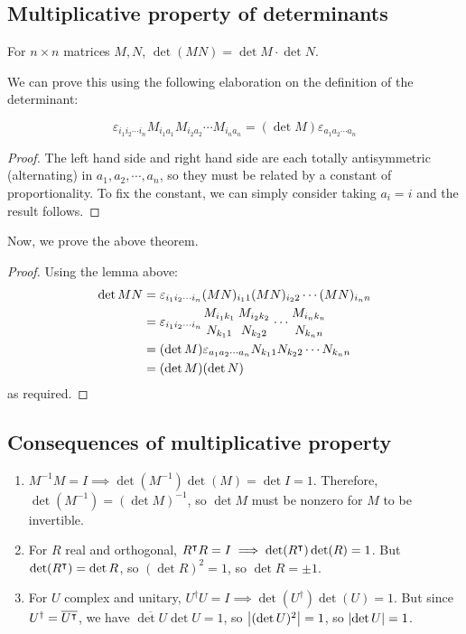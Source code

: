 \subsection{Multiplicative property of determinants}
\begin{theorem}
	For \(n\times n\) matrices \(M, N\), \(\det (MN) = \det M \cdot \det N\).
\end{theorem}
\noindent We can prove this using the following elaboration on the definition of the determinant:
\begin{lemma}
	\[
		\varepsilon_{i_1 i_2 \cdots i_n} M_{i_1 a_1} M_{i_2 a_2} \cdots M_{i_n a_n} = (\det M) \varepsilon_{a_1 a_2 \cdots a_n}
	\]
\end{lemma}
\begin{proof}
	The left hand side and right hand side are each totally antisymmetric (alternating) in \(a_1, a_2, \cdots, a_n\), so they must be related by a constant of proportionality.
	To fix the constant, we can simply consider taking \(a_i = i\) and the result follows.
\end{proof}
\noindent Now, we prove the above theorem.
\begin{proof}
	Using the lemma above:
	\begin{align*}
		\det MN & = \varepsilon_{i_1 i_2 \cdots i_n} (MN)_{i_1 1} (MN)_{i_2 2} \cdots (MN)_{i_n n}                                                    \\
		        & = \varepsilon_{i_1 i_2 \cdots i_n} {M_{i_1 k_1} \atop N_{k_1 1}} {M_{i_2 k_2} \atop N_{k_2 2}} \cdots {M_{i_n k_n} \atop N_{k_n n}} \\
		        & = (\det M) \varepsilon_{a_1 a_2 \cdots a_n} N_{k_1 1} N_{k_2 2} \cdots N_{k_n n}                                                    \\
		        & = (\det M)(\det N)
	\end{align*}
	as required.
\end{proof}

\subsection{Consequences of multiplicative property}
\begin{enumerate}
	\item \(M^{-1}M = I \implies \det(M^{-1}) \det(M) = \det I = 1\).
	      Therefore, \(\det (M^{-1}) = (\det M)^{-1}\), so \(\det M\) must be nonzero for \(M\) to be invertible.
	\item For \(R\) real and orthogonal, \(R^\intercal R = I \implies \det(R^\intercal) \det(R) = 1\).
	      But \(\det (R^\intercal) = \det R\), so \((\det R)^2 = 1\), so \(\det R = \pm 1\).
	\item For \(U\) complex and unitary, \(U^\dagger U = I \implies \det(U^\dagger) \det(U) = 1\).
	      But since \(U^\dagger = \overline{U^\intercal}\), we have \(\overline{\det U} \det U = 1\), so \(\abs{(\det U)^2} = 1\), so \(\abs{\det U} = 1\).
\end{enumerate}

